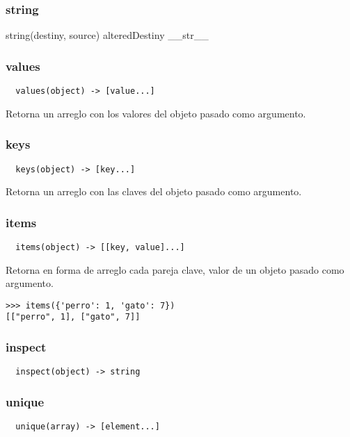 \subsubsection*{string}
string(destiny, source) \rightarrow alteredDestiny
__str__

\subsubsection*{values}
\begin{verbatim}
  values(object) -> [value...]
\end{verbatim}
Retorna un arreglo con los valores del objeto pasado como argumento.

\subsubsection*{keys}
\begin{verbatim}
  keys(object) -> [key...]
\end{verbatim}
Retorna un arreglo con las claves del objeto pasado como argumento.

\subsubsection*{items}
\begin{verbatim}
  items(object) -> [[key, value]...]
\end{verbatim}
Retorna en forma de arreglo cada pareja clave, valor de un objeto pasado como
argumento.
\begin{lstlisting}[style=consola]
>>> items({'perro': 1, 'gato': 7})
[["perro", 1], ["gato", 7]]
\end{lstlisting}

\subsubsection*{inspect}
\begin{verbatim}
  inspect(object) -> string
\end{verbatim}

\subsubsection*{unique}
\begin{verbatim}
  unique(array) -> [element...]
\end{verbatim}

